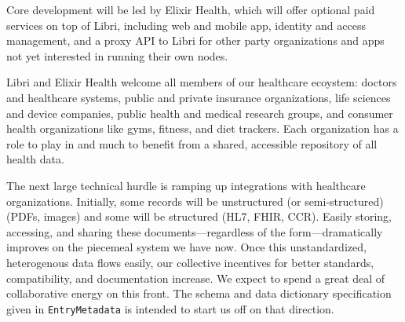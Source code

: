 \documentclass[10pt]{article}
\newcommand{\ttt}[1]{\texttt{#1}}
\begin{document}
Core development will be led by Elixir Health, which will offer optional paid services on top of Libri, including web and mobile app, identity and access management, and a proxy API to Libri for other  party organizations and apps not yet interested in running their own nodes.

Libri and Elixir Health welcome all members of our healthcare ecoystem: doctors and healthcare systems, public and private insurance organizations, life sciences and device companies, public health and medical research groups, and consumer health organizations like gyms, fitness, and diet trackers. Each organization has a role to play in and much to benefit from a shared, accessible repository of all health data.

The next large technical hurdle is ramping up integrations with healthcare organizations. Initially, some records will be unstructured (or semi-structured) (PDFs, images) and some will be structured (HL7, FHIR, CCR). Easily storing, accessing, and sharing these documents---regardless of the form---dramatically improves on the piecemeal system we have now. Once this unstandardized, heterogenous data flows easily, our collective incentives for better standards, compatibility, and documentation increase. We expect to spend a great deal of collaborative energy on this front. The schema and data dictionary specification given in \ttt{EntryMetadata} is intended to start us off on that direction. 
\end{document}
